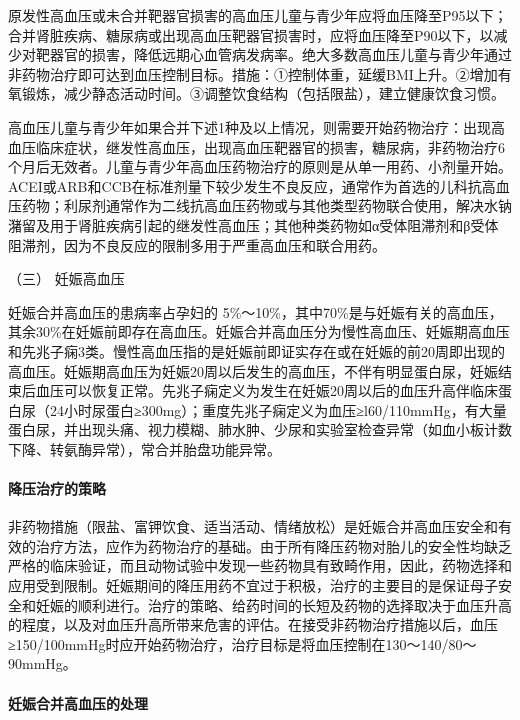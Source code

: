 原发性高血压或未合并靶器官损害的高血压儿童与青少年应将血压降至P95以下；合并肾脏疾病、糖尿病或出现高血压靶器官损害时，应将血压降至P90以下，以减少对靶器官的损害，降低远期心血管病发病率。绝大多数高血压儿童与青少年通过非药物治疗即可达到血压控制目标。措施：①控制体重，延缓BMI上升。②增加有氧锻炼，减少静态活动时间。③调整饮食结构（包括限盐），建立健康饮食习惯。

高血压儿童与青少年如果合并下述1种及以上情况，则需要开始药物治疗：出现高血压临床症状，继发性高血压，出现高血压靶器官的损害，糖尿病，非药物治疗6个月后无效者。儿童与青少年高血压药物治疗的原则是从单一用药、小剂量开始。ACEI或ARB和CCB在标准剂量下较少发生不良反应，通常作为首选的儿科抗高血压药物；利尿剂通常作为二线抗高血压药物或与其他类型药物联合使用，解决水钠潴留及用于肾脏疾病引起的继发性高血压；其他种类药物如α受体阻滞剂和β受体阻滞剂，因为不良反应的限制多用于严重高血压和联合用药。

\hypertarget{text00409.htmlux5cux23CHP17-3-1-8-3}{}
（三） 妊娠高血压

妊娠合并高血压的患病率占孕妇的
5\%～10\%，其中70\%是与妊娠有关的高血压，其余30\%在妊娠前即存在高血压。妊娠合并高血压分为慢性高血压、妊娠期高血压和先兆子痫3类。慢性高血压指的是妊娠前即证实存在或在妊娠的前20周即出现的高血压。妊娠期高血压为妊娠20周以后发生的高血压，不伴有明显蛋白尿，妊娠结束后血压可以恢复正常。先兆子痫定义为发生在妊娠20周以后的血压升高伴临床蛋白尿（24小时尿蛋白≥300mg）；重度先兆子痫定义为血压≥l60/110mmHg，有大量蛋白尿，并出现头痛、视力模糊、肺水肿、少尿和实验室检查异常（如血小板计数下降、转氨酶异常），常合并胎盘功能异常。

\paragraph{降压治疗的策略}

非药物措施（限盐、富钾饮食、适当活动、情绪放松）是妊娠合并高血压安全和有效的治疗方法，应作为药物治疗的基础。由于所有降压药物对胎儿的安全性均缺乏严格的临床验证，而且动物试验中发现一些药物具有致畸作用，因此，药物选择和应用受到限制。妊娠期间的降压用药不宜过于积极，治疗的主要目的是保证母子安全和妊娠的顺利进行。治疗的策略、给药时间的长短及药物的选择取决于血压升高的程度，以及对血压升高所带来危害的评估。在接受非药物治疗措施以后，血压≥150/100mmHg时应开始药物治疗，治疗目标是将血压控制在130～140/80～90mmHg。

\paragraph{妊娠合并高血压的处理}

